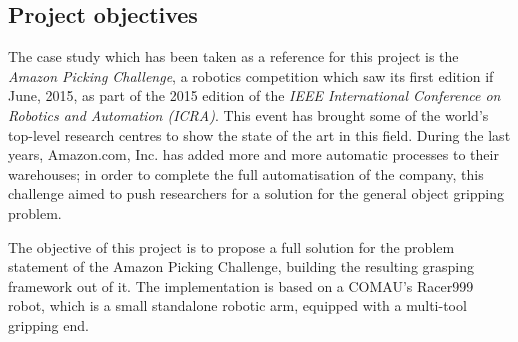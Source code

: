 \documentclass[a4paper,11pt]{article}
\begin{document}
\subsection*{Project objectives}
The case study which has been taken as a reference for this project is
the \emph{Amazon Picking Challenge}, a robotics competition which saw
its first edition if June, 2015, as part of the 2015 edition of the \emph{IEEE
International Conference on Robotics and Automation (ICRA)}. This
event has brought some of the world's top-level research 
centres to show the state of the art in this field. During the last
years, Amazon.com, Inc. has
added more and more automatic processes to their warehouses; in order
to complete the full automatisation of the company, this challenge
aimed to push researchers for a solution for the general object gripping
problem.

The objective of this project is to propose a full solution for the
problem statement of the Amazon Picking Challenge, building the
resulting grasping framework out of it. The implementation is based on a
COMAU's Racer999 robot, which is a small standalone robotic arm,
equipped with a multi-tool gripping end.
\end{document}
